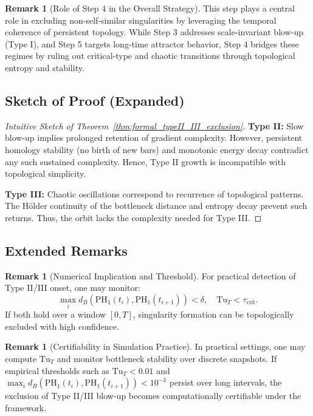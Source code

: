 \documentclass[11pt]{article}
\theoremstyle{definition}
\newtheorem{remark}[theorem]{Remark}
\begin{document}
\begin{remark}[Role of Step 4 in the Overall Strategy]
This step plays a central role in excluding non-self-similar singularities by leveraging the temporal coherence of persistent topology. While Step 3 addresses scale-invariant blow-up (Type I), and Step 5 targets long-time attractor behavior, Step 4 bridges these regimes by ruling out critical-type and chaotic transitions through topological entropy and stability.
\end{remark}

\subsection*{Sketch of Proof (Expanded)}

\begin{proof}[Intuitive Sketch of Theorem~\ref{thm:formal_typeII_III_exclusion}]
\textbf{Type II:} Slow blow-up implies prolonged retention of gradient complexity. However, persistent homology stability (no birth of new bars) and monotonic energy decay contradict any such sustained complexity. Hence, Type II growth is incompatible with topological simplicity.

\textbf{Type III:} Chaotic oscillations correspond to recurrence of topological patterns. The Hölder continuity of the bottleneck distance and entropy decay prevent such returns. Thus, the orbit lacks the complexity needed for Type III.
\end{proof}

\subsection*{Extended Remarks}

\begin{remark}[Numerical Implication and Threshold]
For practical detection of Type II/III onset, one may monitor:
\[
\max_{i} d_B(\mathrm{PH}_1(t_i), \mathrm{PH}_1(t_{i+1})) < \delta, \quad \mathrm{Tu}_T < \tau_{\text{crit}}.
\]
If both hold over a window $[0,T]$, singularity formation can be topologically excluded with high confidence.
\end{remark}

\begin{remark}[Certifiability in Simulation Practice]
In practical settings, one may compute $\mathrm{Tu}_T$ and monitor bottleneck stability over discrete snapshots. If empirical thresholds such as $\mathrm{Tu}_T < 0.01$ and $\max_i d_B(\mathrm{PH}_1(t_i), \mathrm{PH}_1(t_{i+1})) < 10^{-3}$ persist over long intervals, the exclusion of Type II/III blow-up becomes computationally certifiable under the framework.
\end{remark}
\end{document}
